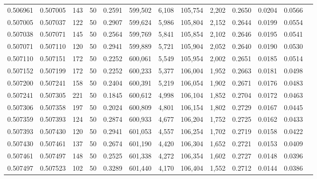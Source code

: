 \begin{tabular}{rrrrrrrrrrrrr}
0.506961 & 0.507005 & 143 &  50 &                                     0.2591 & 599,502 &   6,108 & 105,754 &   2,202 & 0.2650 & 0.0204 & 0.0566 \\
0.507005 & 0.507037 & 122 &  50 &                                     0.2907 & 599,624 &   5,986 & 105,804 &   2,152 & 0.2644 & 0.0199 & 0.0554 \\
0.507038 & 0.507071 & 145 &  50 &                                     0.2564 & 599,769 &   5,841 & 105,854 &   2,102 & 0.2646 & 0.0195 & 0.0541 \\
0.507071 & 0.507110 & 120 &  50 &                                     0.2941 & 599,889 &   5,721 & 105,904 &   2,052 & 0.2640 & 0.0190 & 0.0530 \\
0.507110 & 0.507151 & 172 &  50 &                                     0.2252 & 600,061 &   5,549 & 105,954 &   2,002 & 0.2651 & 0.0185 & 0.0514 \\
0.507152 & 0.507199 & 172 &  50 &                                     0.2252 & 600,233 &   5,377 & 106,004 &   1,952 & 0.2663 & 0.0181 & 0.0498 \\
0.507200 & 0.507241 & 158 &  50 &                                     0.2404 & 600,391 &   5,219 & 106,054 &   1,902 & 0.2671 & 0.0176 & 0.0483 \\
0.507241 & 0.507305 & 221 &  50 &                                     0.1845 & 600,612 &   4,998 & 106,104 &   1,852 & 0.2704 & 0.0172 & 0.0463 \\
0.507306 & 0.507358 & 197 &  50 &                                     0.2024 & 600,809 &   4,801 & 106,154 &   1,802 & 0.2729 & 0.0167 & 0.0445 \\
0.507359 & 0.507393 & 124 &  50 &                                     0.2874 & 600,933 &   4,677 & 106,204 &   1,752 & 0.2725 & 0.0162 & 0.0433 \\
0.507393 & 0.507430 & 120 &  50 &                                     0.2941 & 601,053 &   4,557 & 106,254 &   1,702 & 0.2719 & 0.0158 & 0.0422 \\
0.507430 & 0.507461 & 137 &  50 &                                     0.2674 & 601,190 &   4,420 & 106,304 &   1,652 & 0.2721 & 0.0153 & 0.0409 \\
0.507461 & 0.507497 & 148 &  50 &                                     0.2525 & 601,338 &   4,272 & 106,354 &   1,602 & 0.2727 & 0.0148 & 0.0396 \\
0.507497 & 0.507523 & 102 &  50 &                                     0.3289 & 601,440 &   4,170 & 106,404 &   1,552 & 0.2712 & 0.0144 & 0.0386 \\

\end{tabular}
